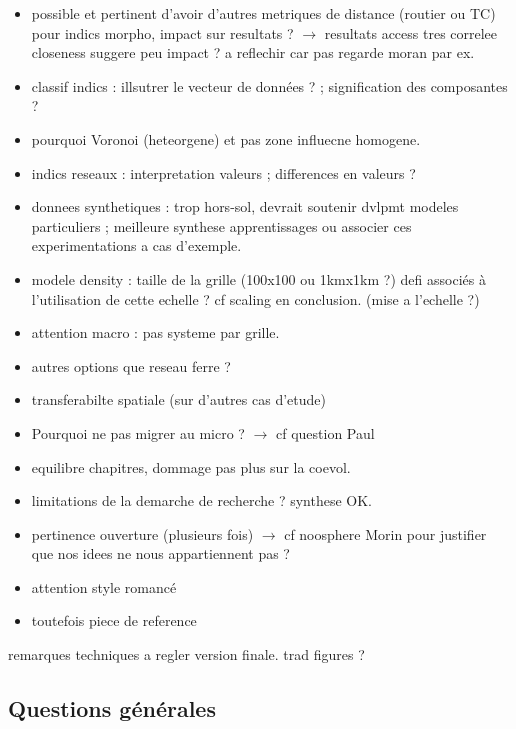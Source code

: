 \documentclass[11pt]{article}
\begin{document}
\begin{itemize}
	\item possible et pertinent d'avoir d'autres metriques de distance (routier ou TC) pour indics morpho, impact sur resultats ? $\rightarrow$ resultats access tres correlee closeness suggere peu impact ? a reflechir car pas regarde moran par ex.
	\item classif indics : illsutrer le vecteur de données ? ; signification des composantes ?
	\item pourquoi Voronoi (heteorgene) et pas zone influecne homogene.
	\item indics reseaux : interpretation valeurs ; differences en valeurs ?
	\item donnees synthetiques : trop hors-sol, devrait soutenir dvlpmt modeles particuliers ; meilleure synthese apprentissages ou associer ces experimentations a cas d'exemple.
	\item modele density : taille de la grille (100x100 ou 1kmx1km ?) defi associés à l'utilisation de cette echelle ? cf scaling en conclusion. (mise a l'echelle ?)
	\item attention macro : pas systeme par grille.
	\item autres options que reseau ferre ?
	\item transferabilte spatiale (sur d'autres cas d'etude)
	\item Pourquoi ne pas migrer au micro ? $\rightarrow$ cf question Paul
	\item equilibre chapitres, dommage pas plus sur la coevol.
	\item limitations de la demarche de recherche ? synthese OK.
	\item pertinence ouverture (plusieurs fois) $\rightarrow$ cf noosphere Morin pour justifier que nos idees ne nous appartiennent pas ?
	\item attention style romancé
	\item toutefois piece de reference
\end{itemize}

remarques techniques a regler version finale. trad figures ?




\subsection*{Questions générales}
\end{document}
